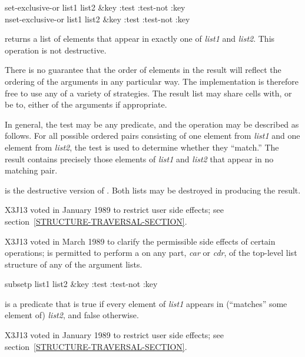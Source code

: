 \begin{defun}[Function]
set-exclusive-or list1 list2 &key :test :test-not :key \\
nset-exclusive-or list1 list2 &key :test :test-not :key

 returns a list of elements that appear
in exactly one of \emph{list1} and \emph{list2}.
This operation is not destructive.

There is no guarantee that the order of elements in the result will
reflect the ordering of the arguments in any particular way.
The implementation is therefore free to use any of a variety of strategies.
The result list may share cells with, or be  to, either of the arguments
if appropriate.

In general, the test may be any predicate, and the  operation
may be described as follows.  For all possible ordered pairs consisting of
one element from \emph{list1} and one element from \emph{list2}, the test is
used to determine whether they ``match.''  The result contains precisely
those elements of \emph{list1} and \emph{list2} that appear in no matching pair.

 is the destructive version of .
Both lists may be destroyed in producing the result.

\begin{new}
X3J13 voted in January 1989
to restrict user side effects; see section~\ref{STRUCTURE-TRAVERSAL-SECTION}.
\end{new}

\begin{newer}
X3J13 voted in March 1989 
to clarify the permissible side effects of certain operations;
 is permitted to perform a  on any part,
\emph{car} or \emph{cdr}, of the top-level list structure of 
any of the argument lists.
\end{newer}
\end{defun}

\begin{defun}[Function]
subsetp list1 list2 &key :test :test-not :key

 is a predicate that is true if every element of \emph{list1}
appears in (``matches'' some element of) \emph{list2}, and false otherwise.

\begin{new}
X3J13 voted in January 1989
to restrict user side effects; see section~\ref{STRUCTURE-TRAVERSAL-SECTION}.
\end{new}
\end{defun}

